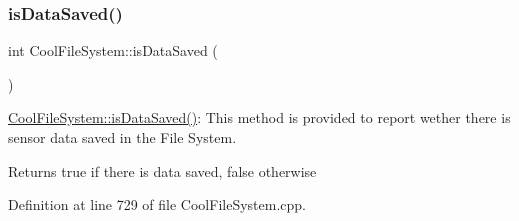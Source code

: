 \subsubsection{\texorpdfstring{is\+Data\+Saved()}{isDataSaved()}}
{\footnotesize\ttfamily int Cool\+File\+System\+::is\+Data\+Saved (\begin{DoxyParamCaption}{ }\end{DoxyParamCaption})}

\hyperlink{class_cool_file_system_ac86a40e7c3a1842f7342f698d34324f9}{Cool\+File\+System\+::is\+Data\+Saved()}\+: This method is provided to report wether there is sensor data saved in the File System.

\begin{DoxyReturn}{Returns}
true if there is data saved, false otherwise 
\end{DoxyReturn}


Definition at line 729 of file Cool\+File\+System.\+cpp.


